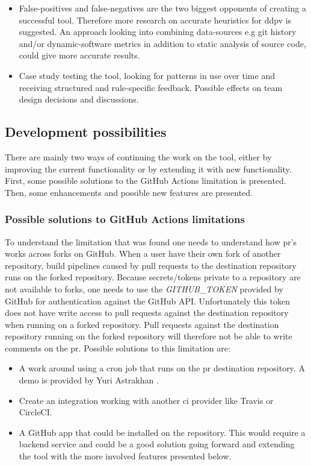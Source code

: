 \documentclass{report}
\begin{document}
\begin{itemize}
    \item False-positives and false-negatives are the two biggest opponents of creating a successful tool. Therefore more research on accurate heuristics for \gls{ddpv} is suggested. An approach looking into combining data-sources e.g git history and/or dynamic-software metrics in addition to static analysis of source code, could give more accurate results. 
    
    \item Case study testing the tool, looking for patterns in use over time and receiving structured and rule-specific feedback. Possible effects on team design decisions and discussions.   
\end{itemize}


\subsection*{Development possibilities}
There are mainly two ways of continuing the work on the tool, either by improving the current functionality or by extending it with new functionality. First, some possible solutions to the GitHub Actions limitation is presented. Then, some enhancements and possible new features are presented.


\subsubsection{Possible solutions to GitHub Actions limitations}

\label{possible-solutions}
To understand the limitation that was found one needs to understand how \gls{pr}'s works across forks on GitHub. When a user have their own fork of another repository, build pipelines caused by pull requests to the destination repository runs on the forked repository. Because secrets/tokens private to a repository are not available to forks, one needs to use the \textit{GITHUB\_TOKEN} provided by GitHub for authentication against the GitHub API. Unfortunately this token does not have write access to pull requests against the destination repository when running on a forked repository. Pull requests against the destination repository running on the forked repository will therefore not be able to write comments on the \gls{pr}. Possible solutions to this limitation are: 
\begin{itemize}
    \item A work around using a cron job that runs on the \gls{pr} destination repository. A demo is provided by Yuri Astrakhan \cite{workaround-demo}. 
    
    \item Create an integration working with another \gls{ci} provider like Travis or CircleCI. 
    
    \item A GitHub app that could be installed on the repository. This would require a backend service and could be a good solution going forward and extending the tool with the more involved features presented below.
\end{itemize}
\end{document}
